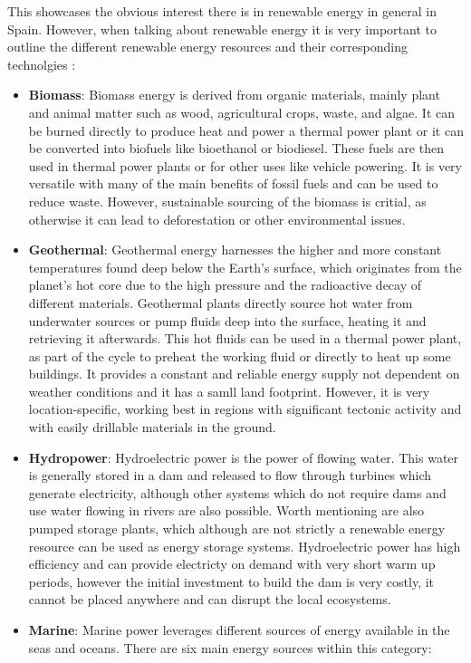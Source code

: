 This showcases the obvious interest there is in renewable energy in general in Spain. However, when talking about renewable energy it is very important to outline the different renewable energy resources and their corresponding technolgies \cite{ellabban_haitham_blaabjerg_2014}:
\begin{itemize}
    \item \textbf{Biomass}: Biomass energy is derived from organic materials, mainly plant and animal matter such as wood, agricultural crops, waste, and algae. It can be burned directly to produce heat and power a thermal power plant or it can be converted into biofuels like bioethanol or biodiesel. These fuels are then used in thermal power plants or for other uses like vehicle powering. It is very versatile with many of the main benefits of fossil fuels and can be used to reduce waste. However, sustainable sourcing of the biomass is critial, as otherwise it can lead to deforestation or other environmental issues.
    \item \textbf{Geothermal}: Geothermal energy harnesses the higher and more constant temperatures found deep below the Earth's surface, which originates from the planet's hot core due to the high pressure and the radioactive decay of different materials. Geothermal plants directly source hot water from underwater sources or pump fluids deep into the surface, heating it and retrieving it afterwards. This hot fluids can be used in a thermal power plant, as part of the cycle to preheat the working fluid or directly to heat up some buildings. It provides a constant and reliable energy supply not dependent on weather conditions and it has a samll land footprint. However, it is very location-specific, working best in regions with significant tectonic activity and with easily drillable materials in the ground. 
    \item \textbf{Hydropower}: Hydroelectric power is the power of flowing water. This water is generally stored in a dam and released to flow through turbines which generate electricity, although other systems which do not require dams and use water flowing in rivers are also possible. Worth mentioning are also pumped storage plants, which although are not strictly a renewable energy resource can be used as energy storage systems. Hydroelectric power has high efficiency and can provide electricty on demand with very short warm up periods, however the initial investment to build the dam is very costly, it cannot be placed anywhere and can disrupt the local ecosystems.
    \item \textbf{Marine}: Marine power leverages different sources of energy available in the seas and oceans. There are six main energy sources within this category:

\end{itemize}
